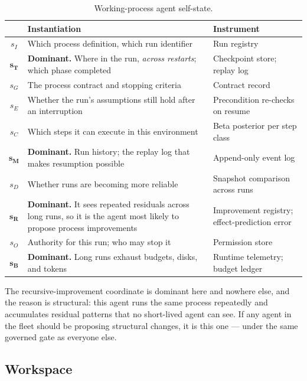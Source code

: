 \documentclass[11pt]{article}
\begin{document}
\begin{table}[h]
\centering\small
\caption{Working-process agent self-state.}
\label{tab:prc-state}
\begin{tabular}{@{}cL{5.6cm}L{6.4cm}@{}}
\toprule
& \textbf{Instantiation} & \textbf{Instrument} \\
\midrule
$s_I$ & Which process definition, which run identifier & Run registry \\
$\mathbf{s_T}$ & \textbf{Dominant.} Where in the run, \emph{across restarts}; which phase completed & Checkpoint store; replay log \\
$s_G$ & The process contract and stopping criteria & Contract record \\
$s_E$ & Whether the run's assumptions still hold after an interruption & Precondition re-checks on resume \\
$s_C$ & Which steps it can execute in this environment & Beta posterior per step class \\
$\mathbf{s_M}$ & \textbf{Dominant.} Run history; the replay log that makes resumption possible & Append-only event log \\
$s_D$ & Whether runs are becoming more reliable & Snapshot comparison across runs \\
$\mathbf{s_R}$ & \textbf{Dominant.} It sees repeated residuals across long runs, so it is the agent most likely to propose process improvements & Improvement registry; effect-prediction error \\
$s_O$ & Authority for this run; who may stop it & Permission store \\
$\mathbf{s_B}$ & \textbf{Dominant.} Long runs exhaust budgets, disks, and tokens & Runtime telemetry; budget ledger \\
\bottomrule
\end{tabular}
\end{table}

The recursive-improvement coordinate is dominant here and nowhere else, and the reason is structural: this agent runs the same process repeatedly and accumulates residual patterns that no short-lived agent can see. If any agent in the fleet should be proposing structural changes, it is this one --- under the same governed gate as everyone else.

\subsection{Workspace}
\end{document}

